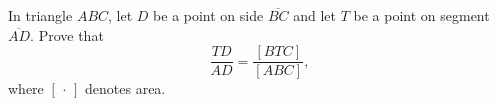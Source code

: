 In triangle $ABC$, let $D$ be a point on side $\overline{BC}$ and let $T$ be a point on segment $\overline{AD}$. Prove that
\[\dfrac{TD}{AD}=\dfrac{[BTC]}{[ABC]},\]
where $[\,\cdot\,]$ denotes area.
